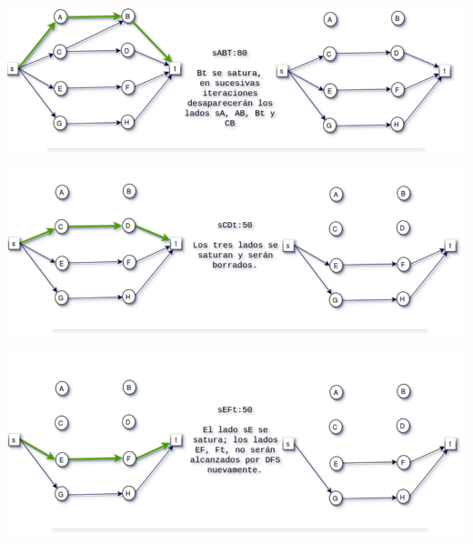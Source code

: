 \documentclass[10pt,a4paper]{article}
\begin{document}
\begin{center}

    \begin{adjustbox}{max size={\textwidth}{\textheight}}
        \includegraphics{definitions/dinic_ej_a.jpg}
        \end{adjustbox}
    
\end{center}

\begin{center}

    \begin{adjustbox}{max size={\textwidth}{\textheight}}
        \includegraphics{definitions/dinic_ej_b.jpg}
        \end{adjustbox}
    
\end{center}

\begin{center}

    \begin{adjustbox}{max size={\textwidth}{\textheight}}
        \includegraphics{definitions/dinic_ej_c.jpg}
        \end{adjustbox}
    
\end{center}
\end{document}
